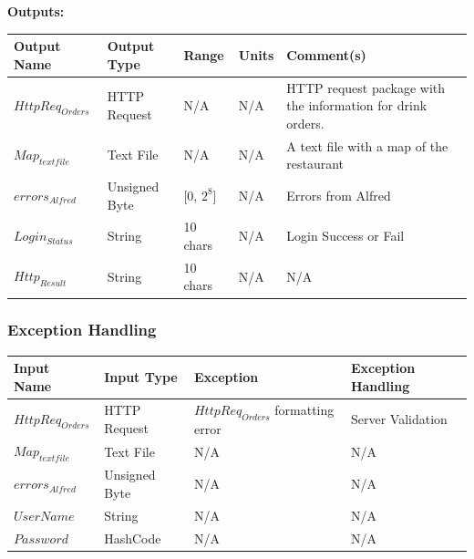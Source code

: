 \documentclass [10pt]{article}
\begin{document}
\textbf{Outputs: } \\

\begin{longtable}{| p{} | p{} | p{} | p{} | p{} |}\hline 
	\rowcolor{tableCell}\textbf{Output Name} & \textbf{Output Type} & \textbf{Range} & \textbf{Units} & \textbf{Comment(s)} \\ \hline
	$ HttpReq_{Orders} $ & HTTP Request & N/A & N/A & HTTP request package with the information for drink orders. \\ \hline
	\rowcolor{tableCell}$ Map_{textfile} $ & Text File & N/A & N/A & A text file with a map of the restaurant \\ \hline
	$  errors_{Alfred} $ & Unsigned Byte & [0, $2^{8}$]& N/A & Errors from Alfred \\ \hline
	\rowcolor{tableCell}$  Login_{Status} $ & String & 10 chars & N/A & Login Success or Fail \\ \hline
	$  Http_{Result} $ & String & 10 chars & N/A & N/A\\ \hline
\end{longtable}



\pagebreak


\subsubsection{Exception Handling}

\begin{longtable}{| l | l | l | l |}\hline 
	\rowcolor{tableCell}\textbf{Input Name} & \textbf{Input Type} & \textbf{Exception} & \textbf{Exception Handling} \\ \hline
	$ HttpReq_{Orders} $ & HTTP Request & $ HttpReq_{Orders} $ formatting error & Server Validation \\ \hline
	\rowcolor{tableCell}$ Map_{textfile} $ & Text File & N/A & N/A \\ \hline
	$  errors_{Alfred} $ & Unsigned Byte & N/A & N/A \\ \hline
	\rowcolor{tableCell}$  UserName $ & String & N/A & N/A\\ \hline
	$  Password $ & HashCode & N/A & N/A \\ \hline
\end{longtable}


\end{document}
